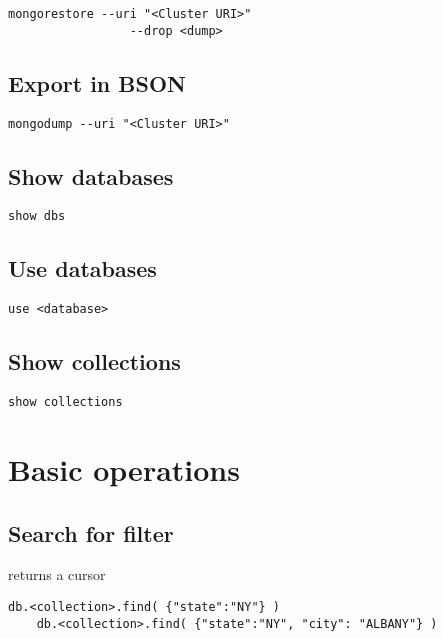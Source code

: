 \documentclass{article}
\begin{document}
\begin{lstlisting}[style=js]
    mongorestore --uri "<Cluster URI>"
                 --drop <dump>
\end{lstlisting}

\subsection{Export in BSON}

\begin{lstlisting}[style=js]
    mongodump --uri "<Cluster URI>"
\end{lstlisting}

\subsection{Show databases}

\begin{lstlisting}[style=js]
    show dbs
\end{lstlisting}

\subsection{Use databases}

\begin{lstlisting}[style=js]
    use <database>
\end{lstlisting}

\subsection{Show collections}

\begin{lstlisting}[style=js]
    show collections
\end{lstlisting}

\pagebreak

\section{Basic operations}

\subsection{Search for filter}

returns a cursor

\begin{lstlisting}[style=js]
    db.<collection>.find( {"state":"NY"} )
    db.<collection>.find( {"state":"NY", "city": "ALBANY"} )
\end{lstlisting}
\end{document}
